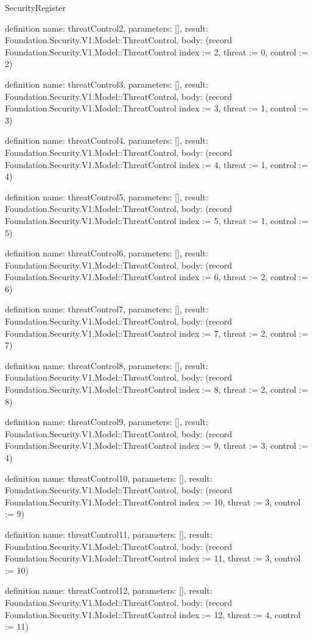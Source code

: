 \begin{lexlean}{SecurityRegister}
\begin{semanticmodule}
definition{
  name: threatControl2,
  parameters: [],
  result: Foundation.Security.V1.Model::ThreatControl,
  body: (record Foundation.Security.V1.Model::ThreatControl {index := 2, threat := 0, control := 2})
}

definition{
  name: threatControl3,
  parameters: [],
  result: Foundation.Security.V1.Model::ThreatControl,
  body: (record Foundation.Security.V1.Model::ThreatControl {index := 3, threat := 1, control := 3})
}

definition{
  name: threatControl4,
  parameters: [],
  result: Foundation.Security.V1.Model::ThreatControl,
  body: (record Foundation.Security.V1.Model::ThreatControl {index := 4, threat := 1, control := 4})
}

definition{
  name: threatControl5,
  parameters: [],
  result: Foundation.Security.V1.Model::ThreatControl,
  body: (record Foundation.Security.V1.Model::ThreatControl {index := 5, threat := 1, control := 5})
}

definition{
  name: threatControl6,
  parameters: [],
  result: Foundation.Security.V1.Model::ThreatControl,
  body: (record Foundation.Security.V1.Model::ThreatControl {index := 6, threat := 2, control := 6})
}

definition{
  name: threatControl7,
  parameters: [],
  result: Foundation.Security.V1.Model::ThreatControl,
  body: (record Foundation.Security.V1.Model::ThreatControl {index := 7, threat := 2, control := 7})
}

definition{
  name: threatControl8,
  parameters: [],
  result: Foundation.Security.V1.Model::ThreatControl,
  body: (record Foundation.Security.V1.Model::ThreatControl {index := 8, threat := 2, control := 8})
}

definition{
  name: threatControl9,
  parameters: [],
  result: Foundation.Security.V1.Model::ThreatControl,
  body: (record Foundation.Security.V1.Model::ThreatControl {index := 9, threat := 3, control := 4})
}

definition{
  name: threatControl10,
  parameters: [],
  result: Foundation.Security.V1.Model::ThreatControl,
  body: (record Foundation.Security.V1.Model::ThreatControl {index := 10, threat := 3, control := 9})
}

definition{
  name: threatControl11,
  parameters: [],
  result: Foundation.Security.V1.Model::ThreatControl,
  body: (record Foundation.Security.V1.Model::ThreatControl {index := 11, threat := 3, control := 10})
}

definition{
  name: threatControl12,
  parameters: [],
  result: Foundation.Security.V1.Model::ThreatControl,
  body: (record Foundation.Security.V1.Model::ThreatControl {index := 12, threat := 4, control := 11})
}


\end{semanticmodule}
\end{lexlean}
